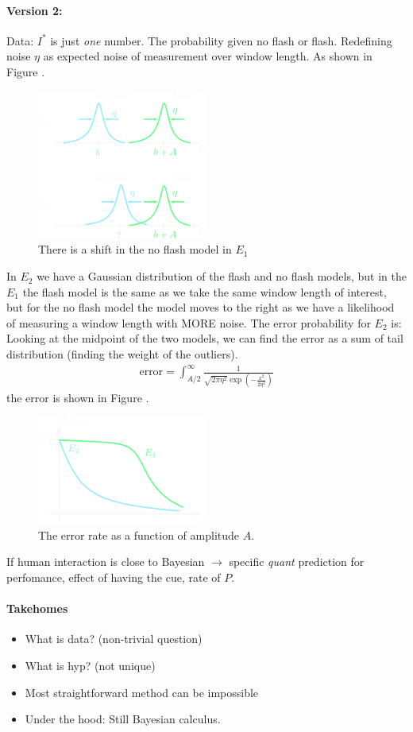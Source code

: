 \documentclass[../main.tex]{subfiles}
\begin{document}
\paragraph*{Version 2:} Data: $I^*$ is just \emph{one} number. The probability given no flash or 
flash. Redefining noise $\eta$ as expected noise of measurement over window length. As shown in
Figure . 
\begin{figure}
    \centering
    \includegraphics[width=0.5\textwidth]{vision_v2.png}
    \caption{There is a shift in the no flash model in $E_1$}
    \label{fig:flash4}
\end{figure}

In $E_2$ we have a Gaussian distribution of the flash and no flash models, but in the $E_1$
the flash model is the same as we take the same window length of interest, but for the no flash model
the model moves to the right as we have a likelihood of measuring a window length with MORE noise. 
The error probability for $E_2$ is: Looking at the midpoint of the two models, we can find the error
as a sum of tail distribution (finding the weight of the outliers).
\begin{align*}
    \text{error} = \int_{A/2}^\infty \frac{1}{\sqrt{2\pi\eta^2} \exp(-\frac{x^2}{2\eta^2})} 
\end{align*}
the error is shown in Figure .
\begin{figure}[ht]
    \centering
    \includegraphics[width=0.5\textwidth]{v_error.png}
    \caption{The error rate as a function of amplitude $A$.}
    \label{fig:flash5}
\end{figure}
If human interaction is close to Bayesian $\to$ specific \emph{quant}
prediction for perfomance, effect of having the cue, rate of $P$.

\paragraph*{Takehomes}
\begin{itemize}
    \item What is data? (non-trivial question)
    \item What is hyp? (not unique)
    \item Most straightforward method can be impossible
    \item Under the hood: Still Bayesian calculus.
\end{itemize}
\end{document}
